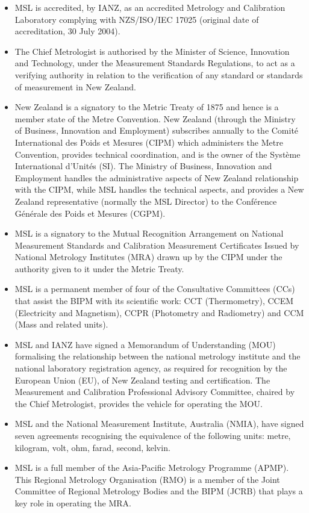 \begin{itemize}

\item	MSL is accredited, by IANZ, as an accredited Metrology and Calibration Laboratory complying with NZS/ISO/IEC 17025 (original date of accreditation, 30 July 2004). 

\item	The Chief Metrologist is authorised by the Minister of Science, Innovation and Technology, under the Measurement Standards Regulations, 
to act as a verifying authority in relation to the verification of any standard or standards of measurement in New Zealand.

\item	New Zealand is a signatory to the Metric Treaty of 1875 and hence is a member state of the Metre Convention.  New Zealand (through the Ministry of Business, Innovation and Employment) subscribes annually to the Comit\'e International des Poids et Mesures (CIPM) which administers the Metre Convention, provides technical coordination, and is the owner of the Syst\`eme International d'Unit\'es (SI). The Ministry of Business, Innovation and Employment handles the administrative aspects of New Zealand relationship with the CIPM, 
while MSL handles the technical aspects, and provides a New Zealand representative (normally the MSL Director) to the Conf\'erence G\'en\'erale des Poids et Mesures (CGPM).

\item	MSL is a signatory to the Mutual Recognition Arrangement on National Measurement Standards and Calibration Measurement Certificates Issued by National Metrology Institutes (MRA) drawn up by the CIPM under the authority given to it under the Metric Treaty.

\item	MSL is a permanent member of four of the Consultative Committees (CCs) that assist the BIPM with its scientific work: CCT (Thermometry), CCEM (Electricity and Magnetism), CCPR (Photometry and Radiometry) and CCM (Mass and related units). 

\item	MSL and IANZ have signed a Memorandum of Understanding (MOU) \cite{MSL_IANZ_MOU} formalising the relationship between the national metrology institute and the national laboratory registration agency, as required for recognition by the European Union (EU), of New Zealand testing and certification. The Measurement and Calibration Professional Advisory Committee, chaired by the Chief Metrologist, provides the vehicle for operating the MOU.

\item	MSL and the National Measurement Institute, Australia (NMIA), have signed seven agreements recognising the equivalence of the following units: metre, kilogram, volt, ohm, farad, second, kelvin.

\item	MSL is a full member of the Asia-Pacific Metrology Programme (APMP). This Regional Metrology Organisation (RMO) is a member of the Joint Committee of Regional Metrology Bodies and the BIPM (JCRB) that plays a key role in operating the MRA.
\end{itemize} 
